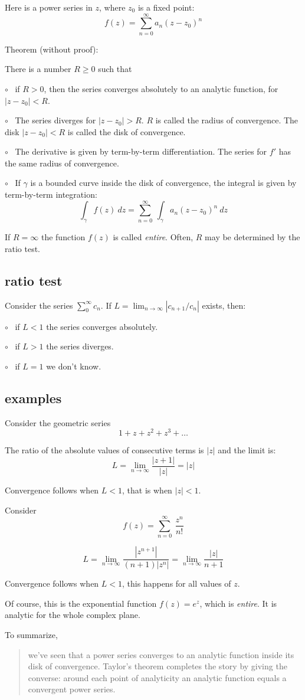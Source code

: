 \documentclass[11pt, oneside]{article}
\begin{document}
Here is a power series in $z$, where $z_0$ is a fixed point:
\[ f(z) = \sum_{n=0}^{\infty} a_n(z - z_0)^n \]

Theorem (without proof):

There is a number $R \ge 0$ such that

$\circ$ \ if $R > 0$, then the series converges absolutely to an analytic function, for $|z - z_0| < R$.

$\circ$ \ The series diverges for $|z - z_0| > R$. $R$ is called the radius of convergence. The disk $|z - z_0| < R$ is called the disk of convergence.

$\circ$ \ The derivative is given by term-by-term differentiation.  The series for $f'$ has the same radius of convergence.

$\circ$ \ If $\gamma$ is a bounded curve inside the disk of convergence, the integral is given by term-by-term integration:
\[ \int_{\gamma} f(z) \ dz = \sum_{n=0}^{\infty} \ \int_{\gamma} a_n(z - z_0)^n \ dz \]

If $R = \infty$ the function $f(z)$ is called \emph{entire}.  Often, $R$ may be determined by the ratio test.

\subsection*{ratio test}
Consider the series $\sum_0^{\infty} c_n$.  If $L = \lim_{n \rightarrow \infty} |c_{n+1}/c_n|$ exists, then:

$\circ$ \ if $L < 1$ the series converges absolutely.

$\circ$ \ if $L > 1$ the series diverges.

$\circ$ \ if $L = 1$ we don't know.

\subsection*{examples}

Consider the geometric series
\[ 1 + z + z^2 + z^3 + \dots \]

The ratio of the absolute values of consecutive terms is $|z|$ and the limit is:
\[ L = \lim_{n \rightarrow \infty} \frac{|z+1|}{|z|} = |z| \]

Convergence follows when $L < 1$, that is when $|z| < 1$.

Consider
\[ f(z) = \sum_{n=0}^{\infty} \ \frac{z^n}{n!} \]

\[ L =  \lim_{n \rightarrow \infty} \frac{|z^{n+1}|}{(n+1) |z^n|} =  \lim_{n \rightarrow \infty} \frac{|z|}{n+1} \]

Convergence follows when $L < 1$, this happens for all values of $z$.

Of course, this is the exponential function $f(z) = e^z$, which is \emph{entire}.  It is analytic for the whole complex plane.

To summarize, 

\begin{quote}we've seen that a power series converges to an analytic function inside its disk of convergence. Taylor’s theorem completes the story by giving the converse: around each point of analyticity an analytic function equals a convergent power series.\end{quote}
\end{document}

